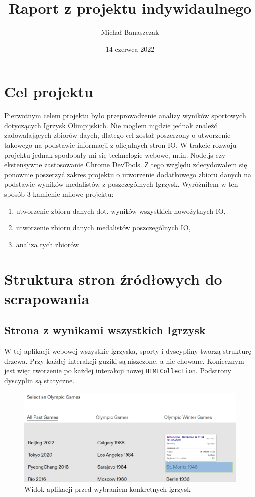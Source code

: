 \documentclass[a4paper,11pt]{article}
\title{Raport z projektu indywidaulnego}
\author{Michał Banaszczak}
\date{14 czerwca 2022}
\begin{document}
\maketitle
\tableofcontents

\section{Cel projektu}
    Pierwotnym celem projektu było przeprowadzenie analizy wyników sportowych
    dotyczących Igrzysk Olimpijskich. Nie mogłem nigdzie jednak znaleźć
    zadowalających zbiorów daych, dlatego cel został poszerzony o utworzenie
    takowego na podstawie informacji z oficjalnych stron IO. W trakcie rozwoju
    projektu jednak spodobały mi się technologie webowe, m.in. Node.js czy
    ekstensywne zastosowanie Chrome DevTools. Z tego względu zdecydowałem się
    ponownie poszerzyć zakres projektu o utworzenie dodatkowego zbioru danych
    na podstawie wyników medalistów z poszczególnych Igrzysk. Wyróżniłem w ten
    sposób 3 kamienie milowe projektu:
    \begin{enumerate}
        \item utworzenie zbioru danych dot. wyników wszystkich nowożytnych IO,
        \item utworzenie zbioru danych medalistów poszczególnych IO,
        \item analiza tych zbiorów
    \end{enumerate}

\section{Struktura stron źródłowych do scrapowania}
\subsection{Strona z wynikami wszystkich Igrzysk}
    W tej aplikacji webowej wszystkie igrzyska, sporty i dyscypliny tworzą
    strukturę drzewa. Przy każdej interakcji guziki są niszczone, a nie chowane.
    Koniecznym jest więc tworzenie po każdej interakcji nowej \verb|HTMLCollection|.
    Podstrony dyscyplin są statyczne.
    \begin{figure}[H]
        \centering
        \includegraphics[width=0.8\linewidth]{1-games-list.png}
        \caption{Widok aplikacji przed wybraniem konkretnych igrzysk}
    \end{figure}
\end{document}
